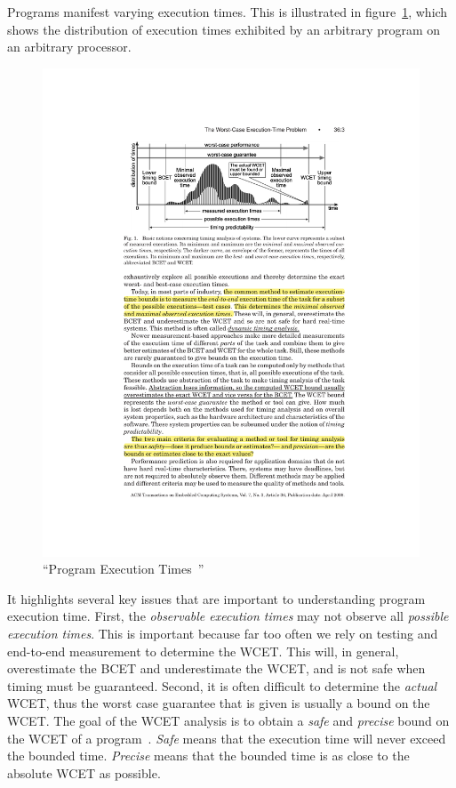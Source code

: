 Programs manifest varying execution times.
This is illustrated in figure~\ref{fig:program_execution_times}, which shows the distribution of execution times exhibited by an arbitrary program on an arbitrary processor.
\begin{figure}[h]
  \begin{center}
    \includegraphics{figs/program_executiontimes.pdf}
  \end{center}
  \vspace{-3mm}
  \caption{``Program Execution Times~\cite{wilhelm-survey-paper}''}
  \label{fig:program_execution_times}
\end{figure}
It highlights several key issues that are important to understanding program execution time.
First, the \emph{observable execution times} may not observe all \emph{possible execution times}.
This is important because far too often we rely on testing and end-to-end measurement to determine the WCET.
This will, in general, overestimate the BCET and underestimate the WCET, and is not safe when timing must be guaranteed. 
Second, it is often difficult to determine the \emph{actual} WCET, thus the worst case guarantee that is given is usually a bound on the WCET.    
The goal of the WCET analysis is to obtain a \textit{safe} and \textit{precise} bound on the WCET of a program~\cite{wilhelm-survey-paper}. 
\textit{Safe} means that the execution time will never exceed the bounded time. 
\textit{Precise} means that the bounded time is as close to the absolute WCET as possible. 

